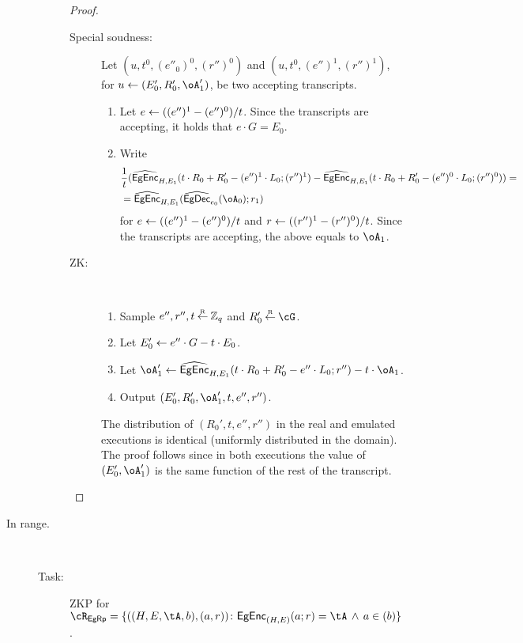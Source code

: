 \begin{description}
\begin{description}
\begin{proof}
\begin{description}
		
		\item[Special soudness:] Let $(u,t^0,(e''_0)^0,(r'')^0)$ and  $(u,t^0,(e'')^1,(r'')^1)$, for $u \asn (E_0',R_0',\oA_1')$, be two accepting transcripts.
		
		\begin{enumerate}
			\item Let $e\leftarrow ((e'')^1 -(e'')^0)/t$.  Since the transcripts are accepting, it holds that   $e \cdot G = E_0$.
			
			
			\item Write 
			\begin{align*}
			&\frac1t (\wEgEnc_{H,E_1}(t\cdot R_0 + R_0' - (e'')^1 \cdot L_0;(r'')^1) - \wEgEnc_{H,E_1}(t\cdot R_0 + R_0' - (e'')^0 \cdot L_0;(r'')^0))=\\
			&= \wEgEnc_{H,E_1}(\wEgDec_{e_0}(\oA_0);r_1)
			\end{align*}
			for $e \leftarrow ((e'')^1 - (e'')^0)/t$ and $r \leftarrow ((r'')^1 - (r'')^0)/t$.  Since the transcripts are accepting, the above equals to $\oA_1$.
			
			
		\end{enumerate}
		
		
			\item[ZK:]~ 
		\begin{enumerate}
			\item Sample $e'',r'',t\mathbin{\stackrel{\mbox{\tiny R}}{\leftarrow}} {\mathbb Z}_q$ and $R_0' \getsr \cG$.
			
			
			
			\item Let $E_0' \leftarrow e''\cdot G- t\cdot E_0$.
			
			
		
			\item Let $ \oA_1' \asn \wEgEnc_{H,E_1}(t\cdot R_0 + R_0' - e'' \cdot L_0;r'') - t\cdot \oA_1$.
			
			\item  Output $(E'_0,R_0',\oA_1',t,e'',r'')$. 
			
		\end{enumerate}		
		
		The distribution of  $(R_0',t,e'',r'')$  in the real and emulated executions is identical (\ie uniformly distributed in the domain).   The proof follows since in both executions the value of  $(E'_0,\oA_1')$  is the same function of the rest of the transcript. 
		
	\end{description}
	\end{proof}
\end{description}
	\item[In range.] ~
	\begin{description}
		\item[Task:] ZKP for $\rEgRp =\rEgRpDef$.
		

\end{description}
\end{description}
